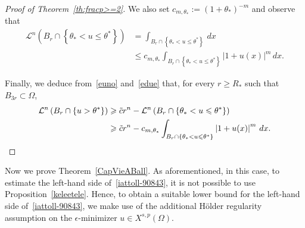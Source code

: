 \documentclass[12pt]{article}
\numberwithin{equation}{section}
\renewcommand{\leq}{\leqslant}
\renewcommand{\geq}{\geqslant}
\begin{document}
\begin{proof}[Proof of Theorem~\ref{th:fracp>=2}]
We also set $c_{m,\theta_*}:=(1+\theta_*)^{-m}$ and observe that
\begin{equation}\label{edue}
\begin{split}
\mathcal{L}^n\left(B_r\cap \left\lbrace \theta_{*}<u\leq \theta^* \right\rbrace\right)&=\int_{B_r\cap \left\lbrace \theta_{*}<u\leq \theta^* \right\rbrace}\,dx\\
& \leq c_{m,\theta_*}\int_{B_r\cap \left\lbrace \theta_{*}<u\leq \theta^* \right\rbrace}\left|1+u(x)\right|^m\,dx.
\end{split}
\end{equation}

Finally, we deduce from~\eqref{euno} and~\eqref{edue}
that, for every $r\geq R_*$  such that $B_{3r}\subset \Omega$, 
\begin{equation*}
\begin{split}
\mathcal{L}^n\left(B_r\cap \left\lbrace u>\theta^* \right\rbrace\right) \geq \;& \tilde{c}r^n-\mathcal{L}^n\left(B_r\cap \left\lbrace \theta_*<u\leq \theta^*\right\rbrace\right)\\
\geq \;& \tilde{c} r^n- c_{m,\theta_*}\int_{B_r\cap \left\lbrace \theta_{*}<u\leq \theta^* \right\rbrace}\left|1+u(x)\right|^m\,dx.\qedhere
\end{split}
\end{equation*}
\end{proof}


Now we prove Theorem~\ref{CapVieABall}. As aforementioned, in this case, to estimate the left-hand side of~\eqref{iattoll-90843}, it is not possible to use Proposition~\ref{keleetele}. Hence, to obtain a suitable lower bound for the left-hand side of~\eqref{iattoll-90843}, we make use of the additional H\"older regularity assumption on the $\epsilon$-minimizer $u\in X^{s,p}(\Omega)$.  
\end{document}
